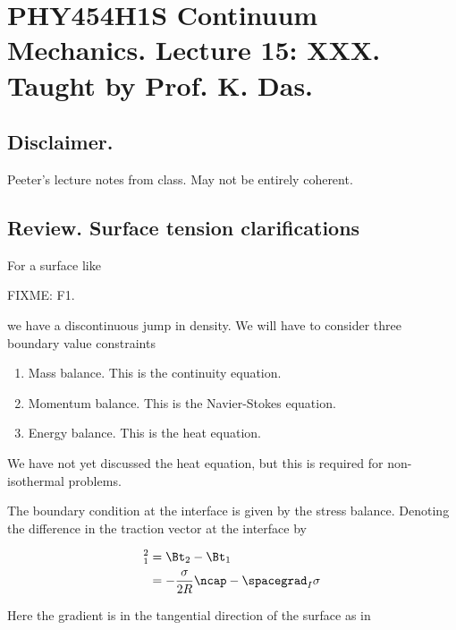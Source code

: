
%

\chapter{PHY454H1S Continuum Mechanics.  Lecture 15: XXX.  Taught by Prof. K. Das.}
\label{chap:continuumL15}
{}
\date{Mar 9, 2012}

\beginArtWithToc

\section{Disclaimer.}

Peeter's lecture notes from class.  May not be entirely coherent.

\section{Review.  Surface tension clarifications}

For a surface like

FIXME: F1.

we have a discontinuous jump in density.  We will have to consider three boundary value constraints

\begin{enumerate}
\item Mass balance.  This is the continuity equation.
\item Momentum balance.  This is the Navier-Stokes equation.
\item Energy balance.  This is the heat equation.
\end{enumerate}

We have not yet discussed the heat equation, but this is required for non-isothermal problems.

The boundary condition at the interface is given by the stress balance.  Denoting the difference in the traction vector at the interface by

\begin{align*}
[\Bt]_1^2 
&= \Bt_2 - \Bt_1 \\
&= -\frac{\sigma}{2 R} \ncap - \spacegrad_I \sigma
\end{align*}

Here the gradient is in the tangential direction of the surface as in 

